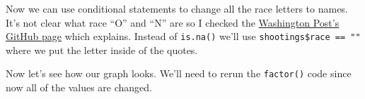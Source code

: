 \documentclass[
  12pt,
]{book}
\newenvironment{Shaded}{\begin{snugshade}}{\end{snugshade}}
\newcommand{\KeywordTok}[1]{\textcolor[rgb]{0.27,0.27,0.27}{\textbf{#1}}}
\newcommand{\NormalTok}[1]{#1}
\newcommand{\OperatorTok}[1]{\textcolor[rgb]{0.43,0.43,0.43}{\textbf{#1}}}
\newcommand{\StringTok}[1]{\textcolor[rgb]{0.5,0.5,0.5}{#1}}
\begin{document}
\begin{Shaded}
\end{Shaded}

Now we can use conditional statements to change all the race letters to names. It's not clear what race ``O'' and ``N'' are so I checked the \href{https://github.com/washingtonpost/data-police-shootings}{Washington Post's GitHub page} which explains. Instead of \texttt{is.na()} we'll use \texttt{shootings\$race\ ==\ ""} where we put the letter inside of the quotes.

\begin{Shaded}
\end{Shaded}

Now let's see how our graph looks. We'll need to rerun the \texttt{factor()} code since now all of the values are changed.
\end{document}
